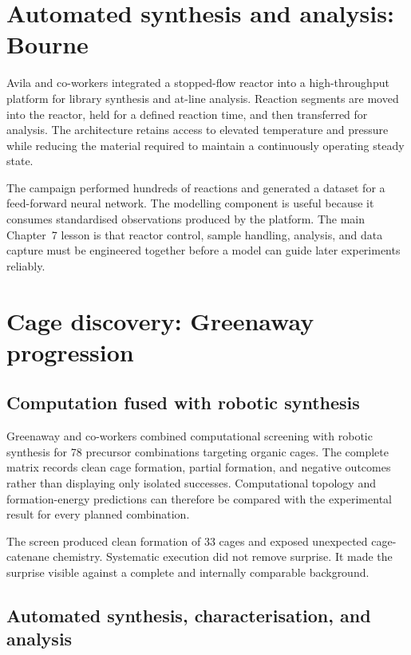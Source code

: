 \section{Automated synthesis and analysis: Bourne}

Avila and co-workers integrated a stopped-flow reactor into a high-throughput platform for library synthesis and at-line analysis.
Reaction segments are moved into the reactor, held for a defined reaction time, and then transferred for analysis.
The architecture retains access to elevated temperature and pressure while reducing the material required to maintain a continuously operating steady state.

The campaign performed hundreds of reactions and generated a dataset for a feed-forward neural network.
The modelling component is useful because it consumes standardised observations produced by the platform.
The main Chapter~7 lesson is that reactor control, sample handling, analysis, and data capture must be engineered together before a model can guide later experiments reliably.

\section{Cage discovery: Greenaway progression}

\subsection{Computation fused with robotic synthesis}

Greenaway and co-workers combined computational screening with robotic synthesis for 78 precursor combinations targeting organic cages.
The complete matrix records clean cage formation, partial formation, and negative outcomes rather than displaying only isolated successes.
Computational topology and formation-energy predictions can therefore be compared with the experimental result for every planned combination.

The screen produced clean formation of 33 cages and exposed unexpected cage-catenane chemistry.
Systematic execution did not remove surprise.
It made the surprise visible against a complete and internally comparable background.

\subsection{Automated synthesis, characterisation, and analysis}

